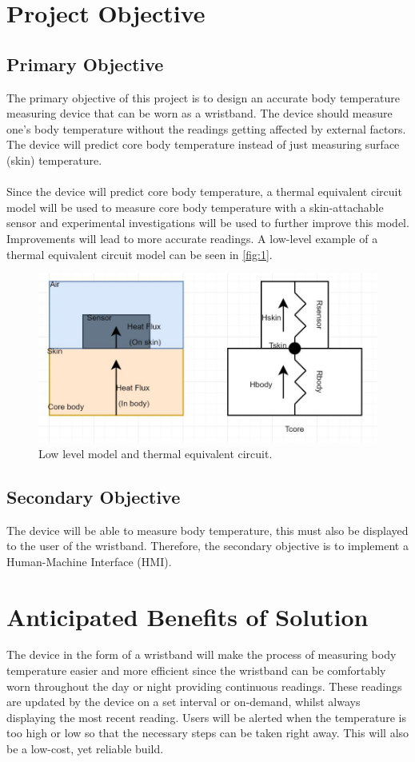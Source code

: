 \section{Project Objective}
\subsection{Primary Objective}
The primary objective of this project is to design an accurate body temperature measuring device that can be worn as a wristband. The device should measure one's body temperature without the readings getting affected by external factors. The device will predict core body temperature instead of just measuring surface (skin) temperature. 
\\
\\
Since the device will predict core body temperature, a thermal equivalent circuit model will be used to measure core body temperature with a skin-attachable sensor and experimental investigations will be used to further improve this model. Improvements will lead to more accurate readings. A low-level example of a thermal equivalent circuit model can be seen in \autoref{fig:1}.
\begin{figure}[!htbp!]
	\centering
	\includegraphics[scale=0.5]{img/Temp_Model}
	\caption{Low level model and thermal equivalent circuit.}
	\label{fig:1}
\end{figure}

\subsection{Secondary Objective}
The device will be able to measure body temperature, this must also be displayed to the user of the wristband. Therefore, the secondary objective is to implement a Human-Machine Interface (HMI). 

\section{Anticipated Benefits of Solution}
The device in the form of a wristband will make the process of measuring body temperature easier and more efficient since the wristband can be comfortably worn throughout the day or night providing continuous readings. These readings are updated by the device on a set interval or on-demand, whilst always displaying the most recent reading. Users will be alerted when the temperature is too high or low so that the necessary steps can be taken right away. This will also be a low-cost, yet reliable build.  

